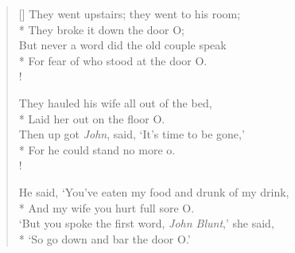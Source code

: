 \documentclass[MAIN]{subfiles}
\begin{document}
\begin{verse}[\versewidth]
They went upstairs; they went to his room;\\*
\vin They broke it down the door O;\\
But never a word did the old couple speak\\*
\vin For fear of who stood at the door O.\\!

They hauled his wife all out of the bed,\\*
\vin Laid her out on the floor O.\\
Then up got \emph{John}, said, `It's time to be gone,'\\*
\vin For he could stand no more o.\\!

He said, `You've eaten my food and drunk of my drink,\\*
\vin And my wife you hurt full sore O.\\
`But you spoke the first word, \emph{John Blunt},' she said,\\*
\vin `So go down and bar the door O.'
\end{verse}
\end{document}
